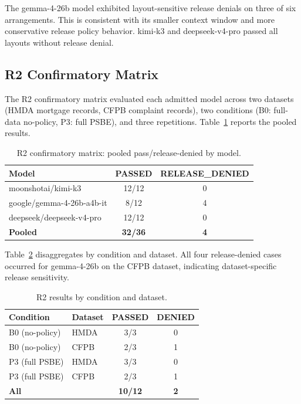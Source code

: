 The gemma-4-26b model exhibited layout-sensitive release denials on three of
six arrangements. This is consistent with its smaller context window and more
conservative release policy behavior. kimi-k3 and deepseek-v4-pro passed all
layouts without release denial.

\subsection{R2 Confirmatory Matrix}

The R2 confirmatory matrix evaluated each admitted model across two datasets
(HMDA mortgage records, CFPB complaint records), two conditions (B0: full-data
no-policy, P3: full PSBE), and three repetitions. Table~\ref{tab:r2_matrix}
reports the pooled results.

\begin{table}[t]
\centering
\caption{R2 confirmatory matrix: pooled pass/release-denied by model.}
\label{tab:r2_matrix}
\small
\begin{tabular}{lcc}
\toprule
Model & PASSED & RELEASE\_DENIED \\
\midrule
moonshotai/kimi-k3 & 12/12 & 0 \\
google/gemma-4-26b-a4b-it & 8/12 & 4 \\
deepseek/deepseek-v4-pro & 12/12 & 0 \\
\midrule
\textbf{Pooled} & \textbf{32/36} & \textbf{4} \\
\bottomrule
\end{tabular}
\end{table}

Table~\ref{tab:r2_by_condition} disaggregates by condition and dataset.
All four release-denied cases occurred for gemma-4-26b on the CFPB dataset,
indicating dataset-specific release sensitivity.

\begin{table}[t]
\centering
\caption{R2 results by condition and dataset.}
\label{tab:r2_by_condition}
\small
\begin{tabular}{llcc}
\toprule
Condition & Dataset & PASSED & DENIED \\
\midrule
B0 (no-policy) & HMDA & 3/3 & 0 \\
B0 (no-policy) & CFPB & 2/3 & 1 \\
P3 (full PSBE) & HMDA & 3/3 & 0 \\
P3 (full PSBE) & CFPB & 2/3 & 1 \\
\midrule
\textbf{All} & & \textbf{10/12} & \textbf{2} \\
\bottomrule
\end{tabular}
\end{table}

